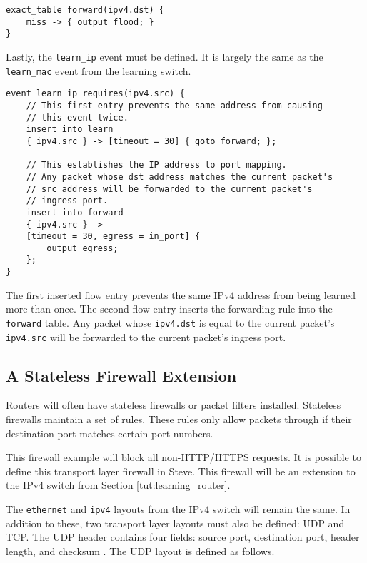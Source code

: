 \begin{codepage}
\begin{lstlisting}
exact_table forward(ipv4.dst) {
	miss -> { output flood; }
}
\end{lstlisting}
\end{codepage}

Lastly, the \texttt{learn\_ip} event must be defined. It is
largely the same as the \texttt{learn\_mac} event from the learning switch.

\begin{codepage}
\begin{lstlisting}
event learn_ip requires(ipv4.src) {
	// This first entry prevents the same address from causing
	// this event twice.
	insert into learn
	{ ipv4.src } -> [timeout = 30] { goto forward; };

	// This establishes the IP address to port mapping.
	// Any packet whose dst address matches the current packet's
	// src address will be forwarded to the current packet's
	// ingress port.
	insert into forward
	{ ipv4.src } ->
	[timeout = 30, egress = in_port] {
		output egress;
	};
}
\end{lstlisting}
\end{codepage}

The first inserted flow entry prevents the same IPv4 address from being learned
more than once. The second flow entry inserts the forwarding rule into the
\texttt{forward} table. Any packet whose \texttt{ipv4.dst} is equal to the current
packet's \texttt{ipv4.src} will be forwarded to the current packet's ingress
port.

\subsection{A Stateless Firewall Extension} \label{tut:firewall}

Routers will often have stateless firewalls or packet filters installed. 
Stateless firewalls maintain a set of rules. These rules only allow packets 
through if their destination port matches certain port numbers. 

This firewall example will block all non-HTTP/HTTPS requests.
It is possible to define this transport layer firewall in Steve. This firewall will be an extension to the IPv4 switch from Section \ref{tut:learning_router}.

The \texttt{ethernet} and \texttt{ipv4} layouts from the IPv4 switch will remain the same. 
In addition to these, two transport layer layouts must also be defined: UDP and TCP.
The UDP header contains four fields: source port, destination port, header length, and checksum \cite{udp_std}. The UDP layout is defined as follows.

